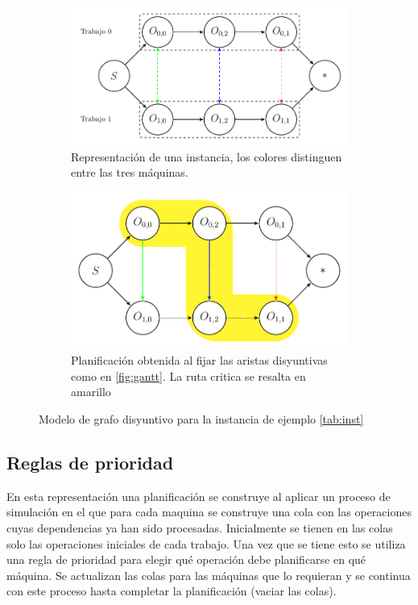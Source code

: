 \begin{figure}
    \begin{subfigure}{.8\textwidth}
        \centering
        \includegraphics[width=.8\linewidth]{Imagenes/disyuntive.pdf}
        \caption{Representación de una instancia, los colores distinguen entre las tres máquinas.}
    \end{subfigure}
    \begin{subfigure}{.8\textwidth}
        \centering
        \includegraphics[width=.8\linewidth]{Imagenes/plandisyuntive.pdf}
        \caption{Planificación obtenida al fijar las aristas disyuntivas como en \ref{fig:gantt}. La ruta critica se resalta en amarillo}
    \end{subfigure}
\caption{Modelo de grafo disyuntivo para la instancia de ejemplo \ref{tab:inst}}
\end{figure}

\subsection*{Reglas de prioridad}
En esta representación una planificación se construye al aplicar un proceso de simulación en el que para cada maquina se construye una cola con las operaciones cuyas dependencias ya han sido procesadas. Inicialmente se tienen en las colas solo las operaciones iniciales de cada trabajo. Una vez que se tiene esto se utiliza una regla de prioridad para elegir qué operación debe planificarse en qué máquina. Se actualizan las colas para las máquinas que lo requieran y se continua con este proceso hasta completar la planificación (vaciar las colas).

